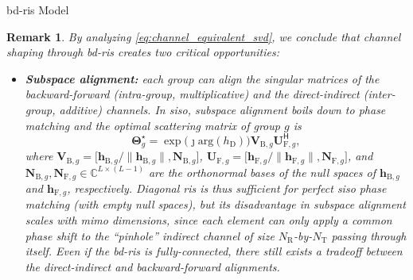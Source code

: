 \documentclass[journal]{IEEEtran}
\newtheorem{remark}{Remark}
\begin{document}
\begin{section}{\gls{bd}-\gls{ris} Model}
	\begin{remark}
		By analyzing \eqref{eq:channel_equivalent_svd}, we conclude that channel shaping through \gls{bd}-\gls{ris} creates two critical opportunities:
		\begin{itemize}
			\item \textbf{Subspace alignment:} each group can align the singular matrices of the backward-forward (intra-group, multiplicative) and the direct-indirect (inter-group, additive) channels. In \gls{siso}, subspace alignment boils down to phase matching and the optimal scattering matrix of group $g$ is
			\begin{equation}
				\mathbf{\Theta}_g^\star = \exp \bigl(\jmath \mathrm{arg}(h_\mathrm{D})\bigr) \mathbf{V}_{\mathrm{B},g} \mathbf{U}_{\mathrm{F},g}^\mathsf{H},
			\end{equation}
			where $\mathbf{V}_{\mathrm{B},g} = \bigl[\mathbf{h}_{\mathrm{B},g}/\lVert \mathbf{h}_{\mathrm{B},g} \rVert, \mathbf{N}_{\mathrm{B},g}\bigr]$, $\mathbf{U}_{\mathrm{F},g} = \bigl[\mathbf{h}_{\mathrm{F},g}/\lVert \mathbf{h}_{\mathrm{F},g} \rVert, \mathbf{N}_{\mathrm{F},g}\bigr]$, and $\mathbf{N}_{\mathrm{B},g}, \mathbf{N}_{\mathrm{F},g} \in \mathbb{C}^{L \times (L-1)}$ are the orthonormal bases of the null spaces of $\mathbf{h}_{\mathrm{B},g}$ and $\mathbf{h}_{\mathrm{F},g}$, respectively.
			Diagonal \gls{ris} is thus sufficient for perfect \gls{siso} phase matching (with empty null spaces), but its disadvantage in subspace alignment scales with \gls{mimo} dimensions, since each element can only apply a common phase shift to the ``pinhole'' indirect channel of size $N_\mathrm{R}$-by-$N_\mathrm{T}$ passing through itself.
			Even if the \gls{bd}-\gls{ris} is fully-connected, there still exists a tradeoff between the direct-indirect and backward-forward alignments.

\end{itemize}
\end{remark}
\end{section}
\end{document}
